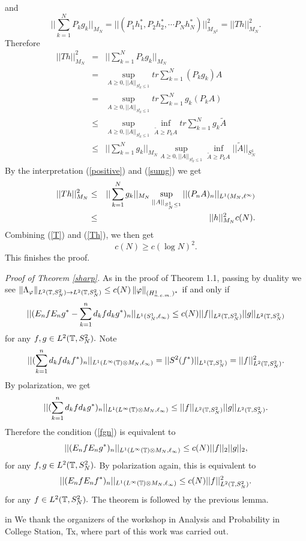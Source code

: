 and
\[
||\sum_{k=1}^NP_kg_k||_{M_N}=||(P_1h_1^{*},P_2h_2^{*},\cdots
P_Nh_N^{*})||_{M_{N^2}}^2=||Th||_{M_N}^2.
\]
Therefore
\begin{eqnarray}
||Th||_{M_N}^2 &=&||\sum_{k=1}^NP_kg_k||_{M_N} \nonumber\\
&=&\sup_{A\geq0,||A||_{S_N^1\leq 1}}tr\sum_{k=1}^N(P_kg_k)A \nonumber\\
&=&\sup_{A\geq0,||A||_{S_N^1\leq 1}}tr\sum_{k=1}^Ng_k(P_kA) \nonumber\\
&\leq &\sup_{A\geq0,||A||_{S_N^1\leq 1}}\inf_{\widetilde{A}\geq P_kA}tr\sum_{k=1}^Ng_k\widetilde{A} \nonumber\\
&\leq &||\sum_{k=1}^Ng_k||_{M_N}\sup_{A\geq0,||A||_{S_N^1\leq
1}}\inf_{\widetilde{A}\geq P_kA}||\widetilde{A}||_{S_N^1} \nonumber
\end{eqnarray}
By the interpretation (\ref{positive}) and (\ref{sumg}) we get
\begin{eqnarray}
||Th||_{M_N}^2
&\leq&||\sum_{k=1}^Ng_k||_{M_N}\sup_{||A||_{S_N^1\leq 1}}||(P_nA)_n||_{L^1(M_N,\ell^\infty)}\nonumber\\
&\leq&||h||_{M_N}^2c(N). \label{Th}
\end{eqnarray}
Combining (\ref{T}) and (\ref{Th}), we then get
\[
c(N)\geq c(\log N)^2.
\]
This finishes the proof.

{\it Proof of Theorem \ref{sharp}.} As in the proof of Theorem 1.1,
passing by duality we see $\| \Lambda_\varphi\|
_{L^2({\mathbb T},S_N^2)\rightarrow L^2({\mathbb T},S_N^2)}\leq c(N)\left\|\varphi\right\|
_{(H_{n.c.m.}^1)^{*}}$ if and only if
\begin{equation}
||({E_nf}{E_ng}^{*}-\sum_{k=1}^nd_kfd_kg^*)_n||_{L^1(S_N^1,\ell
_\infty )}\leq c(N)||f||_{L^2({\mathbb T},S^2_N)}||g||_{L^2({\mathbb T},S^2_N)}
\label{fgn}
\end{equation}
for any $f,g\in L^2({\mathbb T},S_N^2).$ Note
\[
||(\sum_{k=1}^nd_kfd_kf^{*})_n||_{L^1(L^\infty({\mathbb T})\otimes M_N,\ell
_\infty )}=||S^2(f^{*})||_{L^1({\mathbb T},S_N^1)}=||f||_{L^2({\mathbb T},S^2_N)}^2.
\]
By polarization, we get
\[
||(\sum_{k=1}^nd_kfd_kg^{*})_n||_{L^1(L^\infty({\mathbb T})\otimes M_N,\ell
_\infty )}\leq ||f||_{L^2({\mathbb T},S^2_N)}||g||_{L^2({\mathbb T},S^2_N)}.
\]
Therefore the condition (\ref{fgn}) is equivalent to
\[
||({E_nf}{E_ng}^{*})_n||_{L^1(L^\infty({\mathbb T})\otimes M_N,\ell _\infty
)}\leq c(N)||f||_2||g||_2,
\]
for any $f,g\in L^2({\mathbb T},S_N^2).$ By polarization again, this is
equivalent to
\[
||({E_nf}{E_nf}^{*})_n||_{L^1(L^\infty({\mathbb T})\otimes M_N,\ell _\infty
)}\leq c(N)||f||_{L^2({\mathbb T},S_N^2)}^2.
\]
for any $f\in L^2({\mathbb T},S_N^2).$ The theorem is followed by the previous lemma.

 in  We thank the
organizers of the workshop in Analysis and Probability in College
Station, Tx, where part of this work was carried out.

